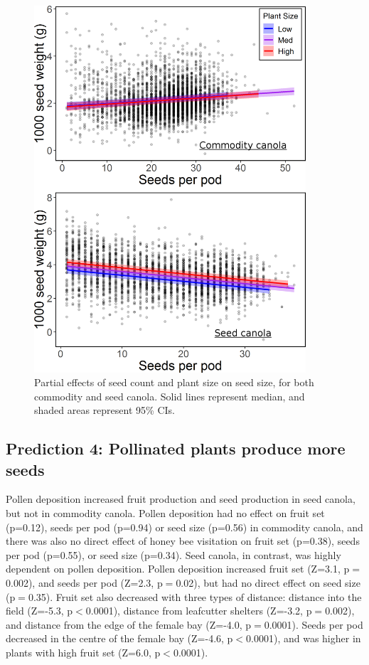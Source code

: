\documentclass[12pt, draft]{article} %
\begin{document}
\begin{figure}
    \centering
    \includegraphics[width=0.9\textwidth,keepaspectratio=true]{seedWeightSeedCount_both.png}
    \caption[Partial effects of seed count and plant size on seed size]{Partial effects of seed count and plant size on seed size, for both commodity and seed canola. Solid lines represent median, and shaded areas represent 95\% CIs.}
    \label{fig:seedWeightCount_both}
\end{figure}

\subsection{Prediction 4: Pollinated plants produce more seeds}

Pollen deposition increased fruit production and seed production in seed canola, but not in commodity canola.
Pollen deposition had no effect on fruit set (p=0.12), seeds per pod (p=0.94) or seed size (p=0.56) in commodity canola, and there was also no direct effect of honey bee visitation on fruit set (p=0.38), seeds per pod (p=0.55), or seed size (p=0.34).
Seed canola, in contrast, was highly dependent on pollen deposition.
Pollen deposition increased fruit set (Z=3.1, p$=$0.002), and seeds per pod (Z=2.3, p$=$0.02), but had no direct effect on seed size (p$=$0.35).
Fruit set also decreased with three types of distance: distance into the field (Z=-5.3, p$<$0.0001), distance from leafcutter shelters (Z=-3.2, p$=$0.002), and distance from the edge of the female bay (Z=-4.0, p$=$0.0001).
Seeds per pod decreased in the centre of the female bay (Z=-4.6, p$<$0.0001), and was higher in plants with high fruit set (Z=6.0, p$<$0.0001).
\end{document}
